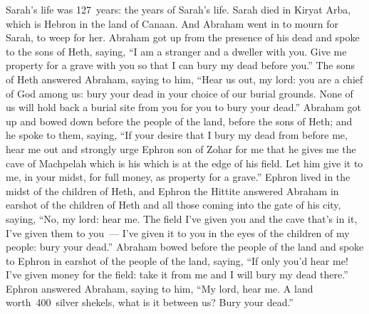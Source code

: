 
\begin{inparaenum}
   Sarah's life was 127~years: the years of Sarah's life.%
   Sarah died in Kiryat Arba, which is Hebron in the land of Canaan. And Abraham went in to mourn for Sarah, to weep for her.%
   Abraham got up from the presence of his dead and spoke to the sons of Heth, saying,%
   ``I am a stranger and a dweller with you. Give me property for a grave with you so that I can bury my dead before you.''%
   The sons of Heth answered Abraham, saying to him,%
   ``Hear us out, my lord: you are a chief of God among us: bury your dead in your choice of our burial grounds. None of us will hold back a burial site from you for you to bury your dead.''%
   Abraham got up and bowed down before the people of the land, before the sons of Heth;%
   and he spoke to them, saying, ``If your desire that I bury my dead from before me, hear me out and strongly urge Ephron son of Zohar for me%
   that he gives me the cave of Machpelah which is his which is at the edge of his field. Let him give it to me, in your midst, for full money, as property for a grave.''%
   Ephron lived in the midst of the children of Heth, and Ephron the Hittite answered Abraham in earshot of the children of Heth and all those coming into the gate of his city, saying,%
   ``No, my lord: hear me. The field I've given you and the cave that's in it, I've given them to you~--- I've given it to you in the eyes of the children of my people: bury your dead.''%
   Abraham bowed before the people of the land%
   and spoke to Ephron in earshot of the people of the land, saying, ``If only you'd hear me! I've given money for the field: take it from me and I will bury my dead there.''%
   Ephron answered Abraham, saying to him,%
   ``My lord, hear me. A land worth\understood\ 400~silver shekels, what is it between us? Bury your dead.''%

\end{inparaenum}

